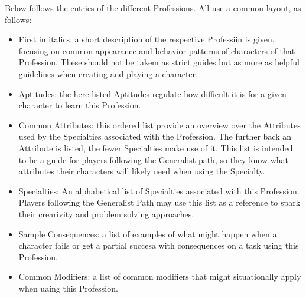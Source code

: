 Below follows the entries of the different Professions. 
All use a common layout, as follows:
\begin{itemize}
	\item First in italics, a short description of the respective Professiin is given, focusing on common appearance and behavior patterns of characters of that Profession.
	These should not be takem as strict guides but as more as helpful guidelines when creating and playing a character.
	\item Aptitudes: the here listed Aptitudes regulate how difficult it is for a given character to learn this Profession.
	\item Common Attributes: this ordered list provide an overview over the Attributes used by the Specialties associated with the Profession. 
	The further back an Attribute is listed, the fewer Specialties make use of it.
	This list is intended to be a guide for players following the Generalist path, so they know what attributes their characters will likely need when using the Specialty.
	\item Specialties: An alphabetical list of Specialties associated with this Profession.
	Players following the Generalist Path may use this list as a reference to spark their crearivity and problem solving approaches.
	\item Sample Consequences: a list of examples of what might happen when a character fails or get a partial succesa with consequences on a task using this Profession.
	\item Common Modifiers: a list of common modifiers that might situationally apply when uaing this Profession.
\end{itemize}

